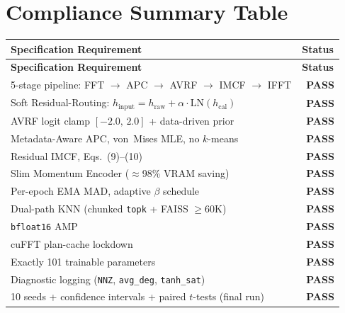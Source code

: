 \documentclass[12pt,a4paper]{article}
\newcommand{\PASS}{\textcolor{passgreen}{\ding{51}~\textbf{PASS}}}
\begin{document}
\section{Compliance Summary Table}

\renewcommand{\arraystretch}{1.3}
\begin{longtable}{|p{9.2cm}|c|}
  \hline
  \textbf{Specification Requirement} & \textbf{Status} \\
  \hline
  \endfirsthead
  \hline
  \textbf{Specification Requirement} & \textbf{Status} \\
  \hline
  \endhead
  \hline
  \endfoot
  \hline
  \endlastfoot

  5-stage pipeline: FFT $\to$ APC $\to$ AVRF $\to$ IMCF $\to$ IFFT          & \PASS \\
  \hline
  Soft Residual-Routing: $h_{\mathrm{input}} = h_{\mathrm{raw}} + \alpha \cdot \mathrm{LN}(h_{\mathrm{cal}})$ & \PASS \\
  \hline
  AVRF logit clamp $[-2.0,\,2.0]$ + data-driven prior                         & \PASS \\
  \hline
  Metadata-Aware APC, von~Mises MLE, no $k$-means                              & \PASS \\
  \hline
  Residual IMCF, Eqs.~(9)--(10)                                                & \PASS \\
  \hline
  Slim Momentum Encoder ($\approx$98\% VRAM saving)                            & \PASS \\
  \hline
  Per-epoch EMA MAD, adaptive $\beta$ schedule                                 & \PASS \\
  \hline
  Dual-path KNN (chunked \texttt{topk} + FAISS $\ge 60\text{K}$)              & \PASS \\
  \hline
  \texttt{bfloat16} AMP                                                        & \PASS \\
  \hline
  cuFFT plan-cache lockdown                                                     & \PASS \\
  \hline
  Exactly 101 trainable parameters                                              & \PASS \\
  \hline
  Diagnostic logging (\texttt{NNZ}, \texttt{avg\_deg}, \texttt{tanh\_sat})     & \PASS \\
  \hline
  10 seeds + confidence intervals + paired $t$-tests (final run)               & \PASS \\[4pt]
  \hline


\end{longtable}
\end{document}
